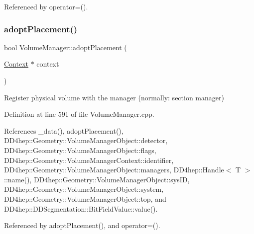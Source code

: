 Referenced by operator=().

\hypertarget{class_d_d4hep_1_1_geometry_1_1_volume_manager_acfeddaf04beb69692702c453a9ad9933}{}\label{class_d_d4hep_1_1_geometry_1_1_volume_manager_acfeddaf04beb69692702c453a9ad9933} 
\subsubsection{\texorpdfstring{adopt\+Placement()}{adoptPlacement()}\hspace{0.1cm}{\footnotesize\ttfamily [1/2]}}
{\footnotesize\ttfamily bool Volume\+Manager\+::adopt\+Placement (\begin{DoxyParamCaption}\item[{\hyperlink{class_d_d4hep_1_1_geometry_1_1_volume_manager_adadb14f2ccbeaad001b7bc6ddb6dc715}{Context} $\ast$}]{context }\end{DoxyParamCaption})}



Register physical volume with the manager (normally\+: section manager) 



Definition at line 591 of file Volume\+Manager.\+cpp.



References \+\_\+data(), adopt\+Placement(), D\+D4hep\+::\+Geometry\+::\+Volume\+Manager\+Object\+::detector, D\+D4hep\+::\+Geometry\+::\+Volume\+Manager\+Object\+::flags, D\+D4hep\+::\+Geometry\+::\+Volume\+Manager\+Context\+::identifier, D\+D4hep\+::\+Geometry\+::\+Volume\+Manager\+Object\+::managers, D\+D4hep\+::\+Handle$<$ T $>$\+::name(), D\+D4hep\+::\+Geometry\+::\+Volume\+Manager\+Object\+::sys\+ID, D\+D4hep\+::\+Geometry\+::\+Volume\+Manager\+Object\+::system, D\+D4hep\+::\+Geometry\+::\+Volume\+Manager\+Object\+::top, and D\+D4hep\+::\+D\+D\+Segmentation\+::\+Bit\+Field\+Value\+::value().



Referenced by adopt\+Placement(), and operator=().

\hypertarget{class_d_d4hep_1_1_geometry_1_1_volume_manager_ac7ad07c472812b32144b3c2a8b4475b2}{}\label{class_d_d4hep_1_1_geometry_1_1_volume_manager_ac7ad07c472812b32144b3c2a8b4475b2} 
